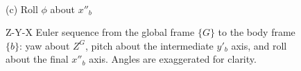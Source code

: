 \begin{figure}[H]
\begin{minipage}[b]{0.32\linewidth}
\\[2pt] {\small (c) Roll $\phi$ about $x''_b$}
\end{minipage}
\caption{Z-Y-X Euler sequence from the global frame $\{G\}$ to the body
frame $\{b\}$: yaw about $Z^G$, pitch about the intermediate $y'_b$ axis,
and roll about the final $x''_b$ axis. Angles are exaggerated for clarity.}
\label{fig:EulerSequence}
\end{figure}
